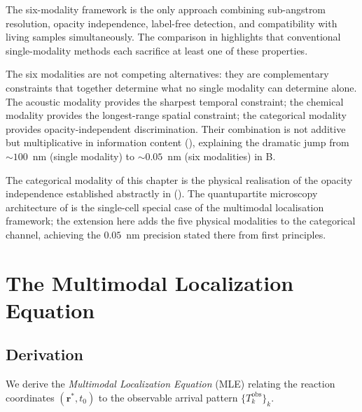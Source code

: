 The six-modality framework is the only approach combining sub-angstrom
resolution, opacity independence, label-free detection, and compatibility
with living samples simultaneously.  The comparison in 
highlights that conventional single-modality methods each sacrifice at least
one of these properties.

\begin{remark}
The six modalities are not competing alternatives: they are complementary
constraints that together determine what no single modality can determine
alone.  The acoustic modality provides the sharpest temporal constraint;
the chemical modality provides the longest-range spatial constraint; the
categorical modality provides opacity-independent discrimination.  Their
combination is not additive but multiplicative in information content
(), explaining the dramatic jump from $\sim 100$~nm
(single modality) to $\sim 0.05$~nm (six modalities) in
B.
\end{remark}

\begin{remark}
The categorical modality of this chapter is the physical realisation of the
opacity independence established abstractly in 
().  The quantupartite microscopy
architecture of  is the single-cell special
case of the multimodal localisation framework; the extension here adds the
five physical modalities to the categorical channel, achieving the
$0.05$~nm precision stated there from first principles.
\end{remark}

\section{The Multimodal Localization Equation}
\label{sec:multimodal-equation}

\subsection{Derivation}

We derive the \emph{Multimodal Localization Equation} (MLE) relating the
reaction coordinates $(\mathbf{r}^*, t_0)$ to the observable arrival
pattern $\{T_k^\mathrm{obs}\}_k$.

